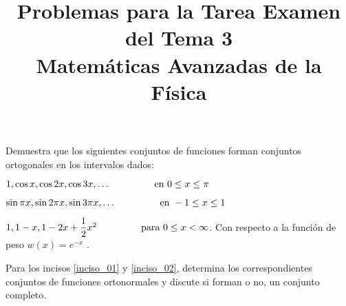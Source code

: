
\title{Problemas para  la Tarea Examen del Tema 3 \\ \large{Matemáticas Avanzadas de la Física}\vspace{-8ex}}
\date{ }

\vspace{-4cm}
\renewcommand\labelenumii{\theenumi.{\arabic{enumii}}}
\maketitle
\fontsize{14}{14}\selectfont
\begin{milista}
\item Demuestra que los siguientes conjuntos de funciones forman conjuntos ortogonales en los intervalos dados:
\begin{milista}
\item $1, \cos x, \cos 2 x, \cos 3 x, \ldots \hspace{1.5cm} \mbox{ en } 0 \leq x \leq \pi$ \label{inciso_01}
\item $\sin \pi x, \sin 2 \pi x, \sin 3 \pi x, \ldots \hspace{1.5cm} \mbox{ en } -1 \leq x \leq 1$ \label{inciso_02}
\item $1, 1 -x, 1 - 2x + \dfrac{1}{2} x^{2} \hspace{1.5cm} \mbox{ para } 0 \leq x < \infty$. Con respecto a la función de peso $w(x) = e^{-x}$ . 
\item Para los incisos \ref{inciso_01} y \ref{inciso_02}, determina los correspondientes conjuntos de funciones ortonormales y discute si forman o no, un conjunto completo.


\end{milista}
\end{milista}
